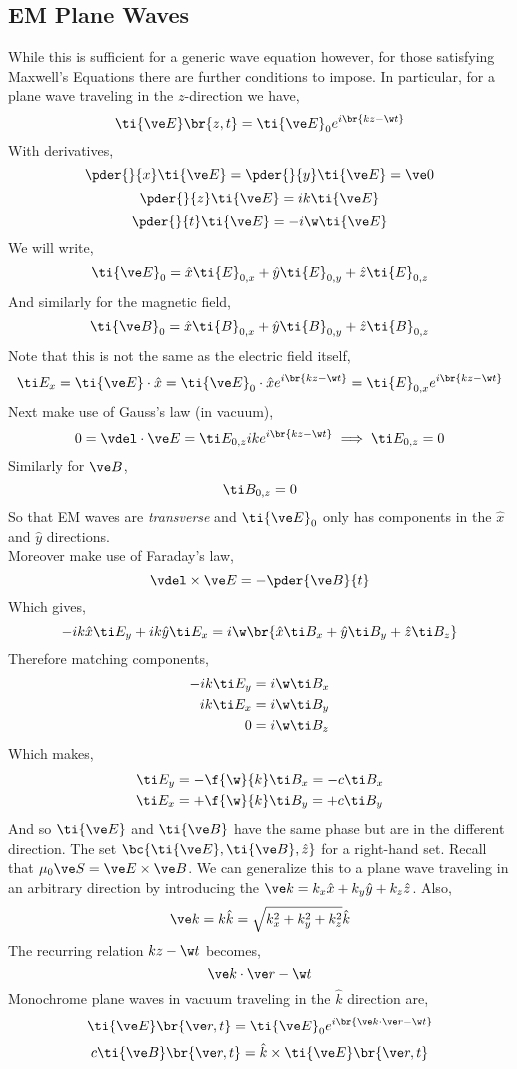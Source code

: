 \documentclass{article}
\begin{document}
\subsection{EM Plane Waves}
While this is sufficient for a generic wave equation however, for those satisfying Maxwell's Equations there are further conditions to impose. In particular, for a plane wave traveling in the $z$-direction we have,
\[ \ti {\ve E} \br{z, t} = \ti{\ve E}_0 e^{i\br{k z - \w t}} \]
With derivatives,
\[ \pder{}{x} \ti {\ve E} = \pder{}{y} \ti {\ve E} = \ve 0 \]
\[ \pder{}{z} \ti {\ve E} = ik \ti {\ve E} \]
\[ \pder{}{t} \ti {\ve E} = -i\w \ti {\ve E} \]
We will write,
\[ \ti{{\ve E}}_0 = \hat x \ti {E}_{0, x} + \hat y \ti {E}_{0, y} + \hat z \ti {E}_{0, z} \]
And similarly for the magnetic field,
\[ \ti {\ve B}_0 = \hat x \ti {B}_{0, x} + \hat y \ti {B}_{0, y} + \hat z \ti {B}_{0, z} \]
Note that this is not the same as the electric field itself,
\[ \ti E_x = \ti{\ve E} \cdot \hat x = \ti{\ve E}_0 \cdot \hat x e^{i \br{kz - \w t}} = \ti{E}_{0,x} e^{i \br{kz - \w t}} \]
Next make use of Gauss's law (in vacuum),
\[ 0 = \vdel \cdot \ve E = \ti E_{0,z} i k e^{i\br{kz - \w t}} \implies \ti E_{0,z} = 0 \]
Similarly for $\ve B$,
\[ \ti B_{0,z} = 0 \]
So that EM waves are \textit{transverse} and $\ti {\ve E}_0$ only has components in the $\hat x$ and $\hat y$ directions.\\

Moreover make use of Faraday's law,
\[ \vdel \times \ve E = - \pder{\ve B}{t} \]
Which gives,
\[ - i k \hat x \ti E_y + i k \hat y \ti E_x = i \w \br{ \hat x \ti B_x + \hat y \ti B_y + \hat z \ti B_z} \]
Therefore matching components,
\begin{align*}
    -i k \ti E_y &= i \w \ti B_x \\
    i k \ti E_x &= i \w \ti B_y \\
    0 &= i \w \ti B_z
\end{align*}
Which makes,
\begin{align*}
    \ti E_y &= - \f{\w}{k} \ti B_x = - c \ti B_x \\
    \ti E_x &= + \f{\w}{k} \ti B_y = + c \ti B_y
\end{align*}
And so $\ti{\ve E}$ and $\ti{\ve B}$ have the same phase but are in the different direction. The set $\bc{\ti{\ve E} , \ti{\ve B} , \hat z}$ for a right-hand set. Recall that $\mu_0 \ve S = \ve E \times \ve B$. We can generalize this to a plane wave traveling in an arbitrary direction by introducing the  $\ve k = k_x \hat x + k_y \hat y + k_z \hat z$. Also,
\[ \ve k = k \hat k = \sqrt{k_x^2 + k_y^2 + k_z^2} \hat k \]
The recurring relation $k z - \w t$ becomes,
\[ \ve k \cdot \ve r - \w t  \]
Monochrome plane waves in vacuum traveling in the $\hat k$ direction are,
\[ \ti{\ve E}\br{\ve r , t} = \ti{\ve E}_0 e^{i\br{\ve k \cdot \ve r - \w t}} \]
\[ c\ti{\ve B}\br{\ve r , t} = \hat k \times \ti{\ve E}\br{\ve r , t} \]
\end{document}
